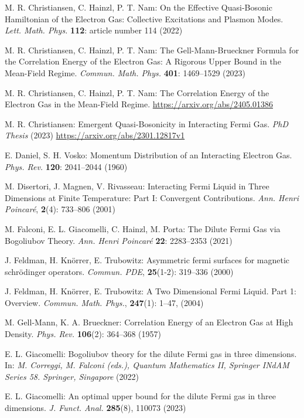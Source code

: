 \documentclass[12pt,a4paper]{article}
\numberwithin{equation}{section}
\newcommand{\1}{\mathbb{I}}
\theoremstyle{plain}
\theoremstyle{definition}
\theoremstyle{remark}
\theoremstyle{plain}
\theoremstyle{definition}
\theoremstyle{remark}
\begin{document}
\begin{thebibliography}{29}
M. R. Christiansen, C. Hainzl, P. T. Nam:
	On the Effective Quasi-Bosonic Hamiltonian of the Electron Gas: Collective Excitations and Plasmon Modes.
	\emph{Lett. Math. Phys.} \textbf{112}: article number 114 (2022)

M. R. Christiansen, C. Hainzl, P. T. Nam:
	The Gell-Mann-Brueckner Formula for the Correlation Energy of the Electron Gas: A Rigorous Upper Bound in the Mean-Field Regime.
	\emph{Commun. Math. Phys.} \textbf{401}: 1469--1529 (2023)

M. R. Christiansen, C. Hainzl, P. T. Nam:
	The Correlation Energy of the Electron Gas in the Mean-Field Regime.
	\url{https://arxiv.org/abs/2405.01386}

M. R. Christiansen:
	Emergent Quasi-Bosonicity in Interacting Fermi Gas.
	\emph{PhD Thesis} (2023)
	\url{https://arxiv.org/abs/2301.12817v1}

E. Daniel, S. H. Vosko:
	Momentum Distribution of an Interacting Electron Gas.
	\emph{Phys. Rev.} \textbf{120}: 2041--2044 (1960)

M. Disertori, J. Magnen, V. Rivasseau:
	Interacting {{Fermi Liquid}} in {{Three Dimensions}} at {{Finite
  Temperature}}: {{Part I}}: {{Convergent Contributions}}.
	\emph{Ann. Henri Poincar\'e}, \textbf{2}(4): 733--806 (2001)

M. Falconi, E. L. Giacomelli, C. Hainzl, M. Porta:
	The Dilute Fermi Gas via Bogoliubov Theory.
	\emph{Ann. Henri Poincar\'e} \textbf{22}: 2283--2353 (2021)

J. Feldman, H. Kn{\"o}rrer, E. Trubowitz:
	Asymmetric fermi surfaces for magnetic schr\"odinger operators.
	\emph{Commun. PDE},
  \textbf{25}(1-2): 319--336 (2000)

J. Feldman, H. Kn{\"o}rrer,  E. Trubowitz:
	A {{Two Dimensional Fermi Liquid}}. {{Part}} 1: {{Overview}}.
	\emph{Commun. Math. Phys.}, \textbf{247}(1): 1--47, (2004)

M. Gell-Mann, K. A. Brueckner:
	Correlation Energy of an Electron Gas at High Density.
	\emph{Phys. Rev.} \textbf{106}(2): 364--368 (1957)

E. L. Giacomelli:
	Bogoliubov theory for the dilute Fermi gas in three dimensions.
	In: \emph{M. Correggi, M. Falconi (eds.), Quantum Mathematics II, Springer INdAM Series 58. Springer, Singapore} (2022)

E. L. Giacomelli:
	An optimal upper bound for the dilute Fermi gas in three dimensions.
	\emph{J. Funct. Anal.} \textbf{285}(8), 110073 (2023)


\end{thebibliography}
\end{document}
